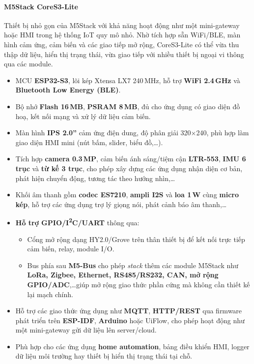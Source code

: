                 \paragraph*{M5Stack CoreS3-Lite}
                    Thiết bị nhỏ gọn của M5Stack với khả năng hoạt động như một mini-gateway hoặc HMI trong hệ thống IoT quy mô nhỏ. Nhờ tích hợp sẵn WiFi/BLE, màn hình cảm ứng, cảm biến và các giao tiếp mở rộng, CoreS3-Lite có thể vừa thu thập dữ liệu, hiển thị trạng thái, vừa giao tiếp với nhiều thiết bị ngoại vi thông qua các module.
                    \begin{itemize}
                        \item MCU \textbf{ESP32-S3}, lõi kép Xtensa LX7 240\,MHz, hỗ trợ \textbf{WiFi 2.4\,GHz} và \textbf{Bluetooth Low Energy (BLE)}.
                        \item Bộ nhớ \textbf{Flash 16\,MB}, \textbf{PSRAM 8\,MB}, đủ cho ứng dụng có giao diện đồ hoạ, kết nối mạng và xử lý dữ liệu cảm biến.
                        \item Màn hình \textbf{IPS 2.0''} cảm ứng điện dung, độ phân giải 320$\times$240, phù hợp làm giao diện HMI mini (nút bấm, slider, biểu đồ,\dots).
                        \item Tích hợp \textbf{camera 0.3\,MP}, cảm biến ánh sáng/tiệm cận \textbf{LTR-553}, \textbf{IMU 6 trục} và \textbf{từ kế 3 trục}, cho phép xây dựng các ứng dụng nhận diện cơ bản, phát hiện chuyển động, tương tác theo hướng nhìn,\dots
                        \item Khối âm thanh gồm \textbf{codec ES7210}, \textbf{ampli I2S} và \textbf{loa 1\,W} cùng \textbf{micro kép}, hỗ trợ các ứng dụng trợ lý giọng nói, phát cảnh báo âm thanh,\dots
                        \item \textbf{Hỗ trợ GPIO/I\textsuperscript{2}C/UART} thông qua:
                        \begin{itemize}
                            \item Cổng mở rộng dạng HY2.0/Grove trên thân thiết bị để kết nối trực tiếp cảm biến, relay, module I/O.
                            \item Bus phía sau \textbf{M5-Bus} cho phép \emph{stack} thêm các module M5Stack như \textbf{LoRa, Zigbee, Ethernet, RS485/RS232, CAN, mở rộng GPIO/ADC},\dots giúp mở rộng giao thức phần cứng mà không cần thiết kế lại mạch chính.
                        \end{itemize}
                        \item Hỗ trợ các giao thức ứng dụng như \textbf{MQTT}, \textbf{HTTP/REST} qua firmware phát triển trên \textbf{ESP-IDF}, \textbf{Arduino} hoặc UiFlow, cho phép hoạt động như một mini-gateway gửi dữ liệu lên server/cloud.
                        \item Phù hợp cho các ứng dụng \textbf{home automation}, bảng điều khiển HMI, logger dữ liệu môi trường hay thiết bị hiển thị trạng thái tại chỗ.
                    \end{itemize}


